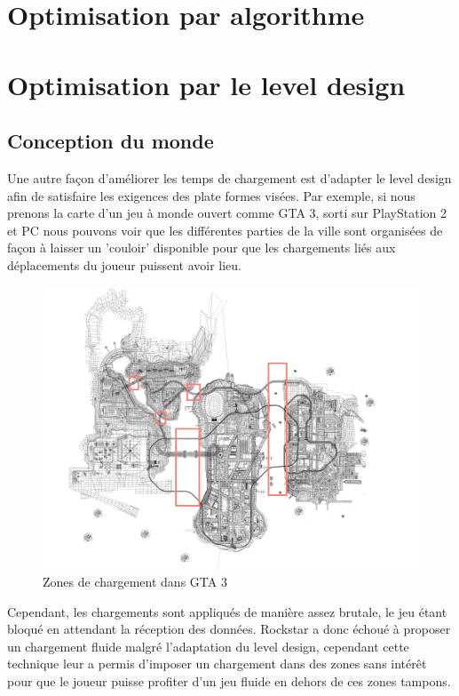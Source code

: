 \documentclass[a4paper, 11pt]{article} %
\begin{document}
\section*{Optimisation par algorithme}


\newpage
\section{Optimisation par le level design}
\subsection{Conception du monde}
Une autre façon d'améliorer les temps de chargement est d'adapter le level design afin de satisfaire les exigences des plate formes visées. Par exemple, si nous prenons la carte d'un jeu à monde ouvert comme GTA 3, sorti sur PlayStation 2 et PC nous pouvons voir que les différentes parties de la ville sont organisées de façon à laisser un 'couloir' disponible pour que les chargements liés aux déplacements du joueur puissent avoir lieu.

\begin{figure}[!h]%
\includegraphics[width=\columnwidth]{images/gta3_map.png}%
\caption{Zones de chargement dans GTA 3}%
\label{}%
\end{figure}

Cependant, les chargements sont appliqués de manière assez brutale, le jeu étant bloqué en attendant la réception des données. Rockstar a donc échoué à proposer un chargement fluide malgré l'adaptation du level design, cependant cette technique leur a permis d'imposer un chargement dans des zones sans intérêt pour que le joueur puisse profiter d'un jeu fluide en dehors de ces zones tampons.
\end{document}
